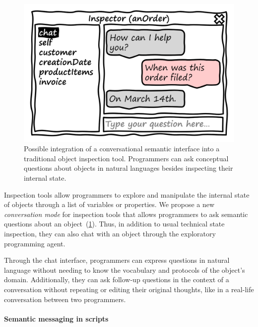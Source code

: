 \begin{figure}
	\centering
	\includegraphics[height=10\baselineskip]{03_agent/inspector.png}
	\caption[Possible integration of a conversational semantic interface into a traditional object inspection tool.]{
		Possible integration of a conversational semantic interface into a traditional object inspection tool.
		Programmers can ask conceptual questions about objects in natural languages besides inspecting their internal state.
	}
	\label{fig:design/agent/interfaces/inspector}
\end{figure}

Inspection tools allow programmers to explore and manipulate the internal state of objects through a list of variables or properties.
We propose a new \emph{conversation mode} for inspection tools that allows programmers to ask semantic questions about an object~(\cref{fig:design/agent/interfaces/inspector}).
Thus, in addition to usual technical state inspection, they can also chat with an object through the exploratory programming agent.

Through the chat interface, programmers can express questions in natural language without needing to know the vocabulary and protocols of the object's domain.
Additionally, they can ask follow-up questions in the context of a conversation without repeating or editing their original thoughts, like in a real-life conversation between two programmers.

\paragraph{Semantic messaging in scripts}
\label{par:design/agent/interfaces/messaging}


